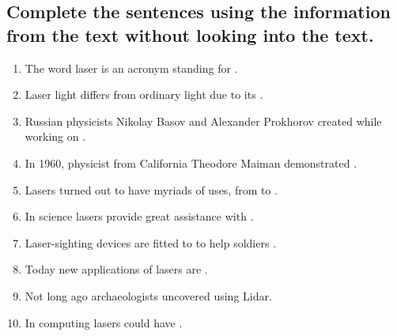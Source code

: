 \subsection*{Complete the sentences using the information from the text without
      looking into the text.}
\begin{enumerate}
      \item The word laser is an acronym standing for \underline{\hspace{2cm}}.
      \item Laser light differs from ordinary light due to its \underline{\hspace{2cm}}.
      \item Russian physicists Nikolay Basov and Alexander Prokhorov created \underline{\hspace{2cm}}
            while working on \underline{\hspace{2cm}}.
      \item In 1960, physicist from California Theodore Maiman demonstrated \underline{\hspace{2cm}}.
      \item Lasers turned out to have myriads of uses, from \underline{\hspace{2cm}} to \underline{\hspace{2cm}}.
      \item In science lasers provide great assistance with \underline{\hspace{2cm}}.
      \item Laser-sighting devices are fitted to \underline{\hspace{2cm}} to help soldiers \underline{\hspace{2cm}}.
      \item Today new applications of lasers are \underline{\hspace{2cm}}.
      \item Not long ago archaeologists uncovered \underline{\hspace{2cm}} using Lidar.
      \item In computing lasers could have \underline{\hspace{2cm}}.
\end{enumerate}


